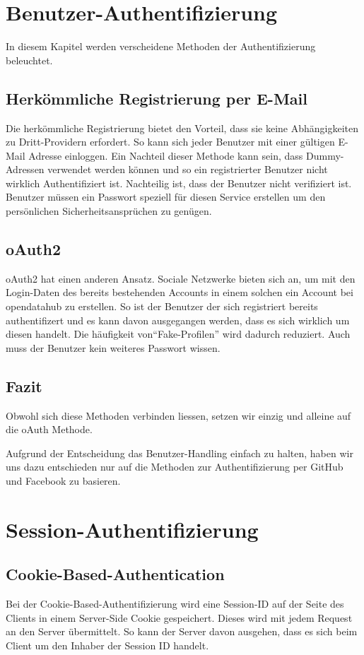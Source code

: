 \section{Benutzer-Authentifizierung}
In diesem Kapitel werden verscheidene Methoden der Authentifizierung beleuchtet.
\subsection{Herkömmliche Registrierung per E-Mail}
Die herkömmliche Registrierung bietet den Vorteil, dass sie keine Abhängigkeiten zu Dritt-Providern erfordert. So kann sich jeder Benutzer mit einer gültigen E-Mail Adresse einloggen. Ein Nachteil dieser Methode kann sein, dass Dummy-Adressen verwendet werden können und so ein registrierter Benutzer nicht wirklich Authentifiziert ist. Nachteilig ist, dass der Benutzer nicht verifiziert ist. Benutzer müssen ein Passwort speziell für diesen Service erstellen um den persönlichen Sicherheitsansprüchen zu genügen.
\subsection{oAuth2}
oAuth2 hat einen anderen Ansatz. Sociale Netzwerke bieten sich an, um mit den Login-Daten des bereits bestehenden Accounts in einem solchen ein Account bei opendatahub zu erstellen. So ist der Benutzer der sich registriert bereits authentifizert und es kann davon ausgegangen werden, dass es sich wirklich um diesen handelt. Die häufigkeit von``Fake-Profilen'' wird dadurch reduziert. Auch muss der Benutzer kein weiteres Passwort wissen.
\subsection{Fazit}
Obwohl sich diese Methoden verbinden liessen, setzen wir einzig und alleine auf die oAuth Methode.
\begin{decision}
Aufgrund der Entscheidung das Benutzer-Handling einfach zu halten, haben wir uns dazu entschieden nur auf die Methoden zur Authentifizierung per GitHub und Facebook zu basieren.
\end{decision}

\section{Session-Authentifizierung}
\subsection{Cookie-Based-Authentication}
Bei der Cookie-Based-Authentifizierung wird eine Session-ID auf der Seite des Clients in einem Server-Side Cookie gespeichert. Dieses wird mit jedem Request an den Server übermittelt. So kann der Server davon ausgehen, dass es sich beim Client um den Inhaber der Session ID handelt.

